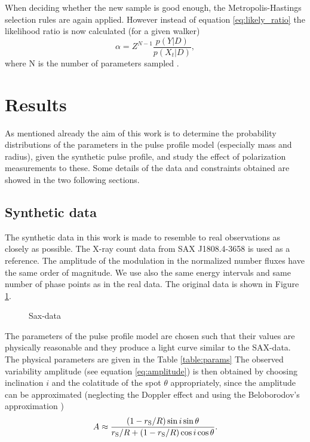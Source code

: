 \documentclass{wihuri}
\def\rg{r_{\rm S}} %
\def\be{\begin{equation}}
\def\ee{\end{equation}}
\def\rg{r_{\rm S}} %
\begin{document}
When deciding whether the new sample is good enough, the Metropolis-Hastings selection rules are again applied. However instead of equation \ref{eq:likely_ratio} the likelihood ratio is now calculated (for a given walker)
\be \label{eq:likely_ratio_smove} 
\alpha = Z^{N-1}\frac{p(Y|D)}{p(X_{t}|D)},
\ee
where N is the number of parameters sampled \cite{ensemble1}. %




\section{Results}

As mentioned already the aim of this work is to determine the probability distributions of the parameters in the pulse profile model (especially mass and radius), given the synthetic pulse profile, and study the effect of polarization measurements to these. Some details of the data and constraints obtained are showed in the two following sections. 


\subsection{Synthetic data}

The synthetic data in this work is made to resemble to real observations as closely as possible. The X-ray count data from SAX J1808.4-3658 is used as a reference. The amplitude of the modulation in the normalized number fluxes have the same order of magnitude. We use also the same energy intervals and same number of phase points as in the real data. The original data is shown in Figure \ref{fig:saxdata}.  

\begin{figure}
\centerline{} 
\caption{Sax-data
\label{fig:saxdata}}
\end{figure}


The parameters of the pulse profile model are chosen such that their values are physically reasonable and they produce a light curve similar to the SAX-data. The physical parameters are given in the Table \ref{table:params} The observed variability amplitude (see equation \ref{eq:amplitude}) is then obtained by choosing inclination $i$ and the colatitude of the spot $\theta$ appropriately, since the amplitude can be approximated (neglecting the Doppler effect and using the Beloborodov's approximation \cite{poutaviironen})
\be \label{eq:amplitude_incthet}
A \approx \frac{(1-\rg/R)\sin i \sin \theta}{\rg/R+(1-\rg/R)\cos i \cos \theta}.
\ee 
\end{document}
